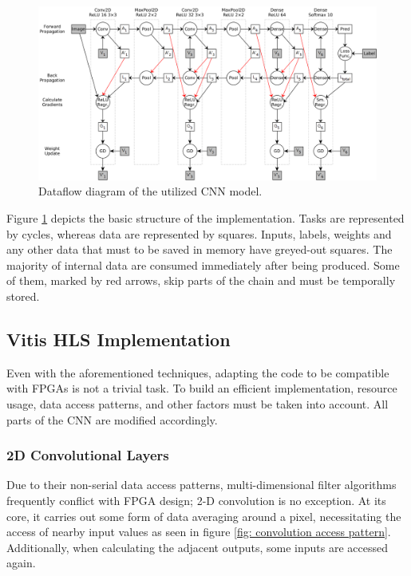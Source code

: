 \begin{figure}[H]
    \centering
        \includegraphics[width=1\textwidth]{Images/block_diagrams/dataflow_cnn_model.png}
        \decoRule
        \caption[CNN dataflow]{Dataflow diagram of the utilized CNN model.}
        \label{fig: CNN dataflow}
\end{figure}

Figure \ref{fig: CNN dataflow} depicts the basic structure of the implementation. Tasks are represented by cycles, whereas data are represented by squares. Inputs, labels, weights and any other data that must to be saved in memory have greyed-out squares. The majority of internal data are consumed immediately after being produced. Some of them, marked by red arrows, skip parts of the chain and must be temporally stored.

\subsection{Vitis HLS Implementation}
Even with the aforementioned techniques, adapting the code to be compatible with FPGAs is not a trivial task. To build an efficient implementation, resource usage, data access patterns, and other factors must be taken into account. All parts of the CNN are modified accordingly.

\subsubsection{2D Convolutional Layers}
Due to their non-serial data access patterns, multi-dimensional filter algorithms frequently conflict with FPGA design; 2-D convolution is no exception. At its core, it carries out some form of data averaging around a pixel, necessitating the access of nearby input values as seen in figure \ref{fig: convolution access pattern}. Additionally, when calculating the adjacent outputs, some inputs are accessed again.

